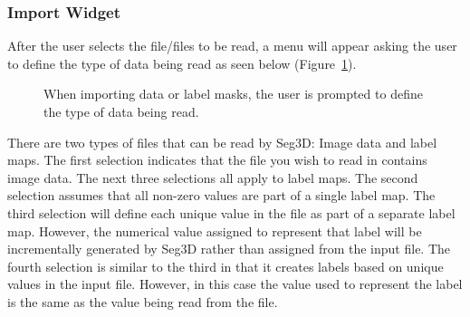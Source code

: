 \documentclass[fleqn,11pt,openany]{book}
\begin{document}
\subsubsection{Import Widget}
After the user selects the file/files to be read, a menu will appear asking the user to define the type of data being read as seen below (Figure~\ref{fig:ImportWidget}).

\begin{figure}[h!]
\caption{When importing data or label masks, the user is prompted to define the type of data being read.}\label{fig:ImportWidget}
\end{figure}

There are two types of files that can be read by Seg3D: Image data and label maps.  The first selection indicates that the file you wish to read in contains image data.  The next three selections all apply to label maps.  The second selection assumes that all non-zero values are part of a single label map.  The third selection will define each unique value in the file as part of a separate label map. However, the numerical value assigned to represent that label will be incrementally generated by Seg3D rather than assigned from the input file. The fourth selection is similar to the third in that it creates labels based on unique values in the input file.  However, in this case the value used to represent the label is the same as the value being read from the file.
\end{document}

